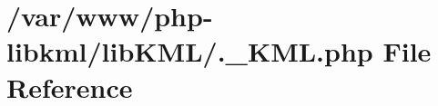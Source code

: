 \hypertarget{_8__KML_8php}{
\section{/var/www/php-\/libkml/libKML/.\_\-KML.php File Reference}
\label{d7/df0/_8__KML_8php}
}
